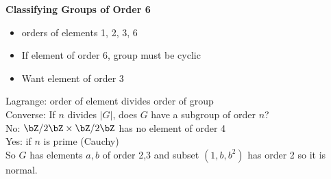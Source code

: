 \noindent 
\textbf{Classifying Groups of Order 6}
\begin{itemize}
    \item orders of elements 1, 2, 3, 6
    \item If element of order 6, group must be cyclic
    \item Want element of order 3
\end{itemize}
Lagrange: order of element divides order of group \\
Converse: If $n$ divides $|G|$, does $G$ have a subgroup of order $n$? \\
No: $\bZ/2\bZ \times \bZ/2\bZ$ has no element of order 4 \\
Yes: if $n$ is prime (Cauchy) \\
So $G$ has elements $a,b$ of order 2,3 and subset $(1, b, b^2)$ has order 2 so it is normal. 